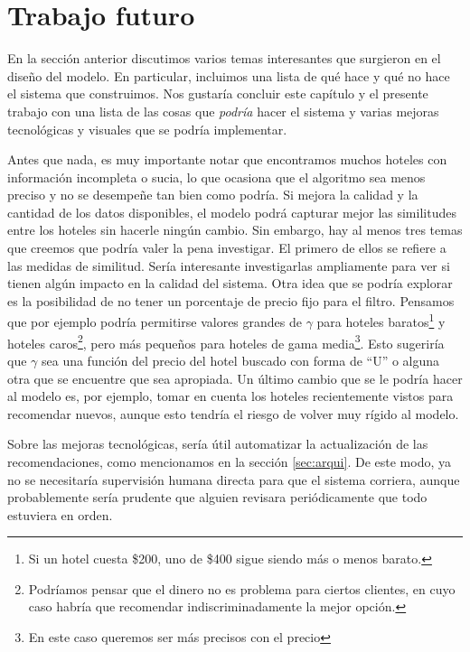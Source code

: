 \documentclass[12pt]{report}
\begin{document}
\section{Trabajo futuro}

En la sección anterior discutimos varios temas interesantes que surgieron en el diseño del modelo. En particular, incluimos una lista de qué hace y qué no hace el sistema que construimos. Nos gustaría concluir este capítulo y el presente trabajo con una lista de las cosas que \emph{podría} hacer el sistema y varias mejoras tecnológicas y visuales que se podría implementar.

Antes que nada, es muy importante notar que encontramos muchos hoteles con información incompleta o sucia, lo que ocasiona que el algoritmo sea menos preciso y no se desempeñe tan bien como podría. Si mejora la calidad y la cantidad de los datos disponibles, el modelo podrá capturar mejor las similitudes entre los hoteles sin hacerle ningún cambio. Sin embargo, hay al menos tres temas que creemos que podría valer la pena investigar. El primero de ellos se refiere a las medidas de similitud. Sería interesante investigarlas ampliamente para ver si tienen algún impacto en la calidad del sistema. Otra idea que se podría explorar es la posibilidad de no tener un porcentaje de precio fijo para el filtro. Pensamos que por ejemplo podría permitirse valores grandes de $\gamma$ para hoteles baratos\footnote{Si un hotel cuesta \$200, uno de \$400 sigue siendo más o menos barato.} y hoteles caros\footnote{Podríamos pensar que el dinero no es problema para ciertos clientes, en cuyo caso habría que recomendar indiscriminadamente la mejor opción.}, pero más pequeños para hoteles de gama media\footnote{En este caso queremos ser más precisos con el precio}. Esto sugeriría que $\gamma$ sea una función del precio del hotel buscado con forma de ``U'' o alguna otra que se encuentre que sea apropiada. Un último cambio que se le podría hacer al modelo es, por ejemplo, tomar en cuenta los hoteles recientemente vistos para recomendar nuevos, aunque esto tendría el riesgo de volver muy rígido al modelo.

Sobre las mejoras tecnológicas, sería útil automatizar la actualización de las recomendaciones, como mencionamos en la sección \ref{sec:arqui}. De este modo, ya no se necesitaría supervisión humana directa para que el sistema corriera, aunque probablemente sería prudente que alguien revisara periódicamente que todo estuviera en orden.
\end{document}
